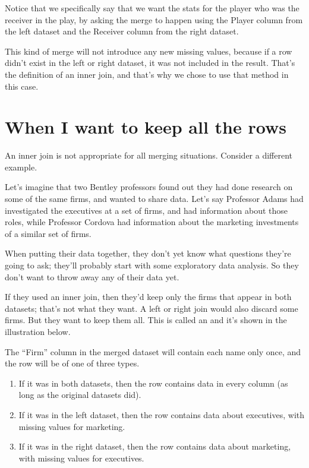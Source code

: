 \documentclass[letterpaper,10pt,english]{sphinxmanual}
\begin{document}
Notice that we specifically say that we want the stats for the player who was the receiver in the play, by asking the merge to happen using the Player column from the left dataset and the Receiver column from the right dataset.

This kind of merge will not introduce any new missing values, because if a row didn’t exist in the left or right dataset, it was not included in the result.  That’s the definition of an inner join, and that’s why we chose to use that method in this case.


\section{When I want to keep all the rows}
\label{\detokenize{chapter-12-concat-and-merge:when-i-want-to-keep-all-the-rows}}
An inner join is not appropriate for all merging situations.  Consider a different example.

Let’s imagine that two Bentley professors found out they had done research on some of the same firms, and wanted to share data.  Let’s say Professor Adams had investigated the executives at a set of firms, and had information about those roles, while Professor Cordova had information about the marketing investments of a similar set of firms.

When putting their data together, they don’t yet know what questions they’re going to ask; they’ll probably start with some exploratory data analysis.  So they don’t want to throw away any of their data yet.

If they used an inner join, then they’d keep only the firms that appear in both datasets; that’s not what they want.  A left or right join would also discard some firms.  But they want to keep them all.  This is called an  and it’s shown in the illustration below.


The “Firm” column in the merged dataset will contain each name only once, and the row will be of one of three types.
\begin{enumerate}
%
\item {} 
If it was in both datasets, then the row contains data in every column (as long as the original datasets did).

\item {} 
If it was in the left dataset, then the row contains data about executives, with missing values for marketing.

\item {} 
If it was in the right dataset, then the row contains data about marketing, with missing values for executives.

\end{enumerate}
\end{document}
